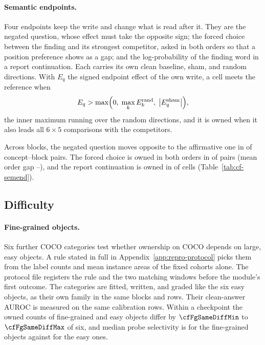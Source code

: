 

\paragraph{Semantic endpoints.} Four endpoints keep the write and change what is read after it. They are the negated question, whose effect must take the opposite sign; the forced choice between the finding and its strongest competitor, asked in both orders so that a position preference shows as a gap; and the log-probability of the finding word in a report continuation. Each carries its own clean baseline, sham, and \cfSemLedgerRandom{} random directions. With $E_q$ the signed endpoint effect of the own write, a cell meets the reference when
\begin{equation}
E_q>\max\Bigl(0,\;\max_{k}E^{\mathrm{rand}}_{k},\;\bigl|E^{\mathrm{sham}}_q\bigr|\Bigr),
\label{eq:endpoint-reference}
\end{equation}
the inner maximum running over the \cfSemLedgerRandom{} random directions, and it is owned when it also leads all $6\times5$ comparisons with the competitors.

Across \cfSemBlocks{} blocks, the negated question moves opposite to the affirmative one in \cfSemNegOpposite{} of \cfSemNegN{} concept--block pairs. The forced choice is owned in both orders in \cfSemForcedOwned{} of \cfSemForcedN{} pairs (mean order gap \cfSemGapMin{}--\cfSemGapMax{}), and the report continuation is owned in \cfSemReportOwned{} of \cfSemReportCells{} cells (Table~\ref{tab:cf-semend}).



\subsection{Difficulty}
\label{app:cf-difficulty}

\paragraph{Fine-grained objects.} Six further COCO categories test whether ownership on COCO depends on large, easy objects. A rule stated in full in Appendix~\ref{app:repro-protocol} picks them from the label counts and mean instance areas of the fixed cohorts alone. The protocol file registers the rule and the two matching windows before the module's first outcome. The categories are fitted, written, and graded like the six easy objects, as their own family in the same blocks and rows. Their clean-answer AUROC is measured on the same calibration rows. Within a checkpoint the owned counts of fine-grained and easy objects differ by $\cfFgSameDiffMin$ to $\cfFgSameDiffMax$ of six, and median probe selectivity is \cfFgFineSel{} for the fine-grained objects against \cfFgEasySameSel{} for the easy ones.

